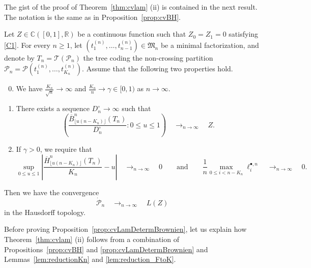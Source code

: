 \documentclass[AHL,XML,longabstracts,Unicode]{cedram}
\newcommand{\R}{\mathbb{R}}
\def\PPP{\mathcal P}
\def\Dcn{D^{\circ}_{n}}
\def\oB{\overline{B}}
\def\oH{\overline{H}}
\begin{document}
 The gist of the proof of Theorem~\ref{thm:cvlam} (ii) is contained in the next result.
 The notation is the same as in Proposition~\ref{prop:cvBH}.

\begin{proposition}
  \label{prop:cvLamDetermBrownien} Let $Z \in {\mathbb{C}}([0, 1], \R)$ be a continuous function such that $Z_{0}=Z_{1}=0$ satisfying \ref{C1}. For every $n \geq 1$, let $(t_{1}^{(n)}, \ldots, t_{n-1}^{(n)}) \in \mathfrak{M}_{n}$  be a minimal factorization, and denote by $T_{n}= \mathcal{T}(  \PPP_{n})$ the tree coding the non-crossing partition $  \PPP_{n}=\PPP(  t_{1}^{(n)}, \ldots, t_{K_{n}}^{(n)})$. Assume that the following two properties hold.
  \begin{enumerate}[label=\color{blue}(D\arabic*)]
    \setcounter{enumi}{-1}
\item\label{D0} We have $\frac{K_{n}}{\sqrt{n}} \rightarrow \infty$ and $ \tfrac{K_{n}}{n} \rightarrow \gamma \in [0,1)$ as $n \rightarrow \infty$.
\item\label{D1} There exists a sequence $\Dcn \rightarrow \infty$ such that
\[  \left(  \frac{\oB^{n}_{\lfloor u (n-K_{n}) \rfloor} (T_{n})}{ \Dcn} : 0\leq u \leq 1\right)  \quad \mathop{\longrightarrow}_{n \rightarrow \infty} \quad Z.\]
\item\label{D2} If $\gamma>0$, we require that
\[ \sup_{0 \leq u \leq 1} \left|   \frac{\oH^{n}_{ \lfloor u (n-K_{n}) \rfloor  }(T_{n})}{K_{n}}-u\right|  \quad \mathop{\longrightarrow}_{n \rightarrow \infty} \quad 0 \qquad \textrm{and} \qquad \frac{1}{n} \max_{0 \leq i < n-K_{n}} \ell^{\bullet,n}_{i}    \quad \mathop{\longrightarrow}_{n \rightarrow \infty} \quad 0.\]
\end{enumerate}
Then we have the  convergence
\begin{equation}
   \dot{\PPP}_{n}    \quad \mathop{\longrightarrow}_{n \rightarrow \infty} \quad L(Z)
\label{eq:cv_FP_SkorokhodBrownien}
\end{equation}
in the Hausdorff topology.
\end{proposition}

Before proving Proposition~\ref{prop:cvLamDetermBrownien}, let us explain how Theorem~\ref{thm:cvlam} (ii)  follows from a combination of Propositions~\ref{prop:cvBH} and \ref{prop:cvLamDetermBrownien} and Lemmas~\ref{lem:reductionKn} and \ref{lem:reduction_FtoK}.
\end{document}
